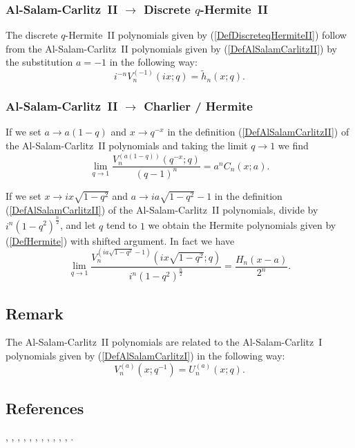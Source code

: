 \documentclass[envcountchap,graybox]{svmono}
\newcounter{rom}
\begin{document}
{{\subsubsection*{Al-Salam-Carlitz~II $\rightarrow$ Discrete $q$-Hermite~II}
The discrete $q$-Hermite~II polynomials given by
(\ref{DefDiscreteqHermiteII}) follow from the Al-Salam-Carlitz~II
polynomials given by (\ref{DefAlSalamCarlitzII}) by the substitution $a=-1$
in the following way:
\begin{equation}
i^{-n}V_n^{(-1)}(ix;q)={\tilde h}_n(x;q).
\end{equation}

\subsubsection*{Al-Salam-Carlitz~II $\rightarrow$ Charlier / Hermite}
If we set $a\rightarrow a(1-q)$ and $x\rightarrow q^{-x}$ in the
definition (\ref{DefAlSalamCarlitzII}) of the Al-Salam-Carlitz~II polynomials
and taking the limit $q\rightarrow 1$ we find
\begin{equation}
\lim_{q\rightarrow 1}\frac{V_n^{(a(1-q))}(q^{-x};q)}{(q-1)^n}=
a^nC_n(x;a).
\end{equation}

If we set $x\rightarrow ix\sqrt{1-q^2}$ and $a\rightarrow ia\sqrt{1-q^2}-1$
in the definition (\ref{DefAlSalamCarlitzII}) of the Al-Salam-Carlitz~II
polynomials, divide by $i^n(1-q^2)^{\frac{n}{2}}$, and let $q$ tend to $1$ we
obtain the Hermite polynomials given by (\ref{DefHermite}) with shifted
argument. In fact we have
\begin{equation}
\lim_{q\rightarrow 1}\frac{V_n^{(ia\sqrt{1-q^2}-1)}(ix\sqrt{1-q^2};q)}
{i^n(1-q^2)^{\frac{n}{2}}}=\frac{H_n(x-a)}{2^n}.
\end{equation}

\subsection*{Remark}
The Al-Salam-Carlitz~II polynomials are related to the Al-Salam-Carlitz~I
polynomials given by (\ref{DefAlSalamCarlitzI}) in the following way:
$$V_n^{(a)}(x;q^{-1})=U_n^{(a)}(x;q).$$

\subsection*{References}
\cite{AlSalam90}, \cite{AlSalamCarlitz}, \cite{AlSalamChihara76},
\cite{AskeySuslovI}, \cite{BergValent}, \cite{Chihara68I},
\cite{Chihara68II}, \cite{Chihara78}, \cite{Dehesa}, \cite{FlorisKoelink},
\cite{Ismail85I}, \cite{Ismail2005I}.


}}
\end{document}
